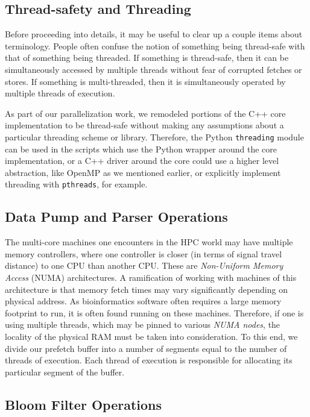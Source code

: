 \documentclass{article}
\begin{document}
\subsection{Thread-safety and Threading}

Before proceeding into details, it may be useful to clear up a couple items about terminology. People often confuse the notion of something being thread-safe with that of something being threaded. If something is thread-safe, then it can be simultaneously accessed by multiple threads without fear of corrupted fetches or stores. If something is multi-threaded, then it is simultaneously operated by multiple threads of execution.

As part of our parallelization work, we remodeled portions of the C++ core implementation to be thread-safe without making any assumptions about a particular threading scheme or library. Therefore, the Python \texttt{threading} module can be used in the scripts which use the Python wrapper around the core implementation, or a C++ driver around the core could use a higher level abstraction, like OpenMP as we mentioned earlier, or explicitly implement threading with \texttt{pthreads}, for example.

\subsection{Data Pump and Parser Operations}

The multi-core machines one encounters in the HPC world may have multiple memory controllers, where one controller is closer (in terms of signal travel distance) to one CPU than another CPU. These are \textit{Non-Uniform Memory Access} (NUMA) architectures. A ramification of working with machines of this architecture is that memory fetch times may vary significantly depending on physical address. As bioinformatics software often requires a large memory footprint to run, it is often found running on these machines. Therefore, if one is using multiple threads, which may be pinned to various \textit{NUMA nodes}, the locality of the physical RAM must be taken into consideration. To this end, we divide our prefetch buffer into a number of segments equal to the number of threads of execution. Each thread of execution is responsible for allocating its particular segment of the buffer.


\subsection{Bloom Filter Operations}
\end{document}
